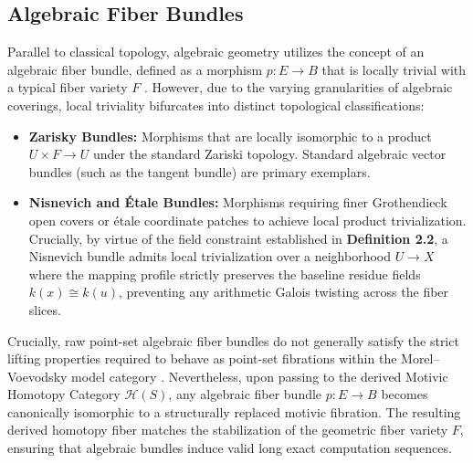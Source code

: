 \documentclass[11pt,oneside]{article}
\begin{document}
\subsection{Algebraic Fiber Bundles}
Parallel to classical topology, algebraic geometry utilizes the concept of an algebraic fiber bundle, defined as a morphism $p: E \to B$ that is locally trivial with a typical fiber variety $F$ \cite{mv99}. However, due to the varying granularities of algebraic coverings, local triviality bifurcates into distinct topological classifications:
\begin{itemize}
    \item \textbf{Zarisky Bundles:} Morphisms that are locally isomorphic to a product $U \times F \to U$ under the standard Zariski topology. Standard algebraic vector bundles (such as the tangent bundle) are primary exemplars.
    \item \textbf{Nisnevich and \'Etale Bundles:} Morphisms requiring finer Grothendieck open covers or \'etale coordinate patches to achieve local product trivialization. Crucially, by virtue of the field constraint established in \textbf{Definition 2.2}, a Nisnevich bundle admits local trivialization over a neighborhood $U \to X$ where the mapping profile strictly preserves the baseline residue fields $k(x) \cong k(u)$, preventing any arithmetic Galois twisting across the fiber slices.
\end{itemize}

Crucially, raw point-set algebraic fiber bundles do not generally satisfy the strict lifting properties required to behave as point-set fibrations within the Morel--Voevodsky model category \cite{mv99}. Nevertheless, upon passing to the derived Motivic Homotopy Category $\mathcal{H}(S)$, any algebraic fiber bundle $p: E \to B$ becomes canonically isomorphic to a structurally replaced motivic fibration. The resulting derived homotopy fiber matches the stabilization of the geometric fiber variety $F$, ensuring that algebraic bundles induce valid long exact computation sequences.
\end{document}
